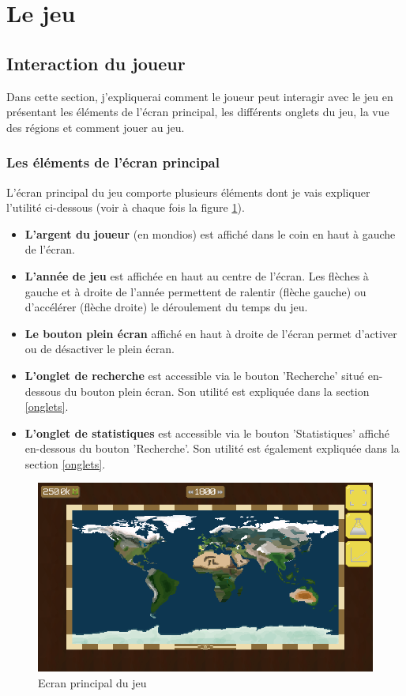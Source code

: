 \documentclass{article}
\begin{document}
        \section{Le jeu}
        \subsection{Interaction du joueur}
		Dans cette section, j'expliquerai comment le joueur peut interagir avec le jeu en présentant les éléments de l'écran principal, les différents onglets du jeu, la vue des régions et comment jouer au jeu.        
        
        \subsubsection{Les éléments de l'écran principal}
		L'écran principal du jeu comporte plusieurs éléments dont je vais expliquer l'utilité ci-dessous (voir à chaque fois la figure \ref{fig:worldView}).
		
		\begin{itemize}
			\item \textbf{L'argent du joueur} (en mondios) est affiché dans le coin en haut à gauche de l'écran.
			\item \textbf{L'année de jeu} est affichée en haut au centre de l'écran. Les flèches à gauche et à droite de l'année permettent de ralentir (flèche gauche) ou d’accélérer (flèche droite) le déroulement du temps du jeu.
			\item \textbf{Le bouton plein écran} affiché en haut à droite de l'écran permet d'activer ou de désactiver le plein écran.
			\item \textbf{L'onglet de recherche} est accessible via le bouton 'Recherche' situé en-dessous du bouton plein écran. Son utilité est expliquée dans la section \ref{onglets}.
			\item  \textbf{L'onglet de statistiques} est accessible via le bouton 'Statistiques' affiché en-dessous du bouton 'Recherche'. Son utilité est également expliquée dans la section \ref{onglets}.
		\end{itemize}
		
		\begin{figure}[H]
                \includegraphics[width=\linewidth]{../images/worldView}
                \caption{Ecran principal du jeu}
                \label{fig:worldView}
        \end{figure} 
		
\end{document}
